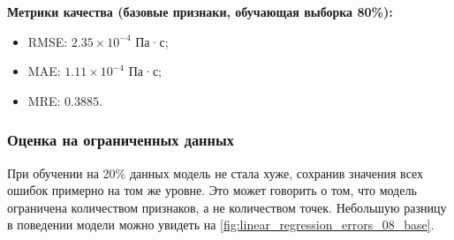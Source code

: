\documentclass[a4paper,12pt]{article}
\begin{document}
    \vspace{5mm}
    \begin{minipage}{\textwidth}
      \textbf{Метрики качества (базовые признаки, обучающая выборка 80\%):}
      \begin{itemize}
          \item RMSE: \( 2.35 \times 10^{-4} \) Па·с;
          \item MAE: \( 1.11 \times 10^{-4} \) Па·с;
          \item MRE: \( 0.3885 \).
      \end{itemize}
    \end{minipage}
    
    \subsubsection{Оценка на ограниченных данных}
    
    При обучении на 20\% данных модель не стала хуже, сохранив значения всех ошибок примерно на том же уровне. Это может говорить о том, что модель ограничена количеством признаков, а не количеством точек. Небольшую разницу в поведении модели можно увидеть на \autoref{fig:linear_regression_errors_08_base}.
    
\end{document}
